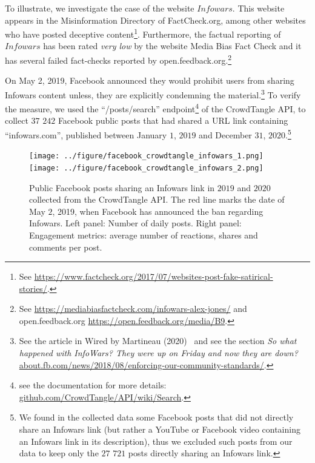 \documentclass{article}
\begin{document}
\smallskip

To illustrate, we investigate the case of the website $Infowars$. This website appears in the Misinformation Directory of FactCheck.org, among other websites who have posted deceptive content\footnote{See \href{https://www.factcheck.org/2017/07/websites-post-fake-satirical-stories/}{https://www.factcheck.org/2017/07/websites-post-fake-satirical-stories/}.}. Furthermore, the factual reporting of $Infowars$ has been rated {\it very low} by the website Media Bias Fact Check and it has several failed fact-checks reported by open.feedback.org.\footnote{See \href{https://mediabiasfactcheck.com/infowars-alex-jones/}{https://mediabiasfactcheck.com/infowars-alex-jones/} and open.feedback.org \href{https://open.feedback.org/media/B9}{https://open.feedback.org/media/B9}.} 

On May 2, 2019, Facebook announced they would prohibit users from sharing Infowars content unless, they are explicitly condemning the material.\footnote{See the article in Wired by Martineau (2020)~\cite{wiredalexjones} and see the section {\it So what happened with InfoWars? They were up on Friday and now they are down?} \href{https://about.fb.com/news/2018/08/enforcing-our-community-standards/}{about.fb.com/news/2018/08/enforcing-our-community-standards/}.} To verify the measure, we used the ``/posts/search'' endpoint\footnote{see the documentation for more details: \href{https://github.com/CrowdTangle/API/wiki/Search}{github.com/CrowdTangle/API/wiki/Search}.} of the CrowdTangle API, to collect $37$ $242$ Facebook public posts that had shared a URL link containing ``infowars.com'', published between January $1$, $2019$ and December $31$, $2020$.\footnote{We found in the collected data some Facebook posts that did not directly share an Infowars link (but rather a YouTube or Facebook video containing an Infowars link in its description), thus we excluded such posts from our data to keep only the $27$ $721$ posts directly sharing an Infowars link.} 

\begin{figure}[h]
\hspace{-2em}
		\texttt{[image: ../figure/facebook\_crowdtangle\_infowars\_1.png]}
		\texttt{[image: ../figure/facebook\_crowdtangle\_infowars\_2.png]} 
	\caption{Public Facebook posts sharing an Infowars link in $2019$ and $2020$ collected from the CrowdTangle API. The red line marks the date of May $2$, 2019, when Facebook has announced the ban regarding Infowars. Left panel: Number of daily posts. Right panel: Engagement metrics: average number of reactions, shares and comments per post. }
	\label{infowars1}
\end{figure}
\end{document}
